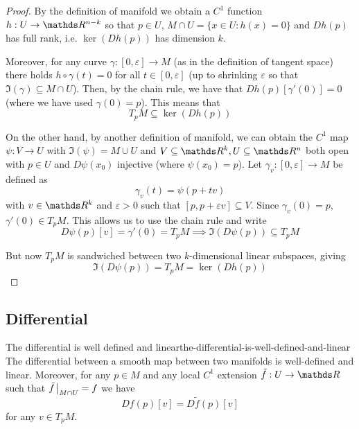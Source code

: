 \documentclass[12pt]{extarticle}
\numberwithin{equation}{subsection}
\begin{document}
\begin{proof}
	By the definition of manifold we obtain a $C^1$ function $h: U \to \R^{n-k}$ so that $p \in U$,
	$M \cap U = \{x \in U: h(x) = 0 \}$ and $Dh(p)$ has full rank, i.e. $\ker(Dh(p))$ has dimension
	$k$.

	Moreover, for any curve $\gamma: [0, \varepsilon] \to M$ (as in the definition of tangent space)
	there holds $h \circ \gamma(t) = 0$ for all $t \in [0, \varepsilon]$ (up to shrinking
	$\varepsilon$ so that $\Im(\gamma) \subseteq M \cap U$).
	Then, by the chain rule, we have that $Dh(p)[\gamma'(0)] = 0$ (where we have used
	$\gamma(0) = p$). This means that
	\begin{equation}
		T_p M \subseteq \ker(Dh(p))
	\end{equation}

	On the other hand, by another definition of manifold, we can obtain the $C^1$ map $\psi: V \to U$
	with $\Im(\psi) = M \cup U$ and $V \subseteq \R^k, U \subseteq \R^n$ both open with $p \in U$ and
	$D \psi(x_0)$ injective (where $\psi(x_0) = p$).
	Let $\gamma_v: [0, \varepsilon] \to M$ be defined as
	\begin{equation}
		\gamma_v(t) = \psi(p + tv)
	\end{equation}
	with $v \in \R^k$ and $\varepsilon >0$ such that $[p, p + \varepsilon v] \subseteq V$.
	Since $\gamma_v(0) = p$, $\gamma'(0) \in T_p M$. This allows us to use the chain rule and write
	\begin{equation}
		D\psi(p)[v] = \gamma'(0) = T_pM \implies \Im(D \psi(p)) \subseteq T_pM
	\end{equation}

	But now $T_pM$ is sandwiched between two $k$-dimensional linear subspaces, giving
	\begin{equation}
		\Im(D\psi(p)) = T_pM = \ker(Dh(p))
	\end{equation}
\end{proof}

\subsection{Differential}

\begin{theorem}{The differential is well defined and linear}{the-differential-is-well-defined-and-linear}
	The differential between a smooth map between two manifolds is well-defined and linear.
	Moreover, for any $p \in M$ and any local $C^1$ extension $\tilde f: U \to \R$ such that
	$\tilde f \eval_{M \cap U} = f$ we have
	\begin{equation}
		Df(p)[v] = D \tilde f(p)[v]
	\end{equation}
	for any $v \in T_pM$.
\end{theorem}
\end{document}
